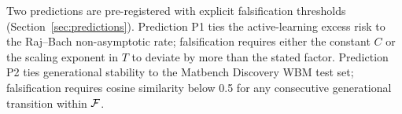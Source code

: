 Two predictions are pre-registered with explicit falsification thresholds (Section~\ref{sec:predictions}). Prediction P1 ties the active-learning excess risk to the Raj--Bach non-asymptotic rate; falsification requires either the constant $C$ or the scaling exponent in $T$ to deviate by more than the stated factor. Prediction P2 ties generational stability to the Matbench Discovery WBM test set; falsification requires cosine similarity below 0.5 for any consecutive generational transition within $\mathcal{F}$.

